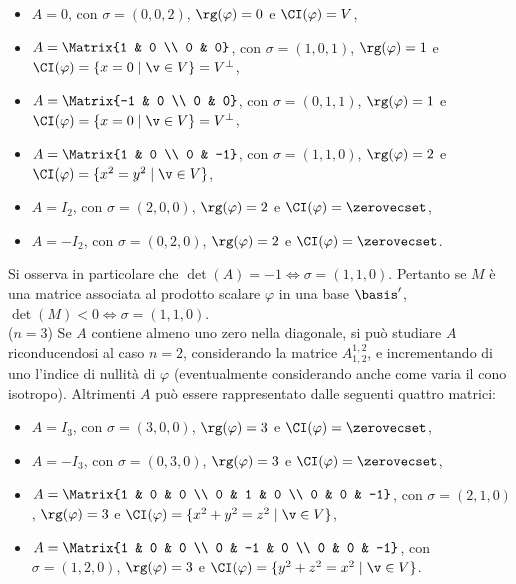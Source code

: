 \begin{itemize}
	\item $A = 0$, con $\sigma = (0, 0, 2)$, $\rg(\varphi) = 0$ e $\CI(\varphi) = V$,
	\item $A = \Matrix{1 & 0 \\ 0 & 0}$, con $\sigma = (1, 0, 1)$, $\rg(\varphi) = 1$ e $\CI(\varphi) = \{x = 0 \mid \v \in V\} = V^\perp$,
	\item $A = \Matrix{-1 & 0 \\ 0 & 0}$, con $\sigma = (0, 1, 1)$, $\rg(\varphi) = 1$ e $\CI(\varphi) = \{x = 0 \mid \v \in V\} = V^\perp$,
	\item $A = \Matrix{1 & 0 \\ 0 & -1}$, con $\sigma = (1, 1, 0)$, $\rg(\varphi) = 2$ e $\CI(\varphi) = \{x^2 = y^2 \mid \v \in V\}$,
	\item $A = I_2$, con $\sigma = (2, 0, 0)$, $\rg(\varphi) = 2$ e $\CI(\varphi) = \zerovecset$,
	\item $A = -I_2$, con $\sigma = (0, 2, 0)$, $\rg(\varphi) = 2$ e $\CI(\varphi) = \zerovecset$.
\end{itemize}

Si osserva in particolare che $\det(A) = -1 \iff \sigma = (1, 1, 0)$. Pertanto se $M$ è una matrice associata
al prodotto scalare $\varphi$ in una base $\basis'$, $\det(M) < 0 \iff \sigma = (1, 1, 0)$. \\

\mbox{($n = 3$)} Se $A$ contiene almeno uno zero nella diagonale, si può studiare $A$ riconducendosi al caso $n = 2$,
considerando la matrice $A^{1,2}_{1,2}$, e incrementando di uno l'indice di nullità di $\varphi$ (eventualmente
considerando anche come varia il cono isotropo). Altrimenti $A$
può essere rappresentato dalle seguenti quattro matrici:

\begin{itemize}
	\item $A = I_3$, con $\sigma = (3, 0, 0)$, $\rg(\varphi) = 3$ e $\CI(\varphi) = \zerovecset$,
	\item $A = -I_3$, con $\sigma = (0, 3, 0)$, $\rg(\varphi) = 3$ e $\CI(\varphi) = \zerovecset$,
	\item $A = \Matrix{1 & 0 & 0 \\ 0 & 1 & 0 \\ 0 & 0 & -1}$, con $\sigma = (2, 1, 0)$, $\rg(\varphi) = 3$ e $\CI(\varphi) = \{ x^2 + y^2 = z^2 \mid \v \in V \}$,
	\item $A = \Matrix{1 & 0 & 0 \\ 0 & -1 & 0 \\ 0 & 0 & -1}$, con $\sigma = (1, 2, 0)$, $\rg(\varphi) = 3$ e $\CI(\varphi) = \{ y^2 + z^2 = x^2 \mid \v \in V \}$.
\end{itemize}

